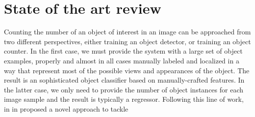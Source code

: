 \newpage
\chapter{State of the art review}
\label{sec:state}

Counting the number of an object of interest in an image can be approached from two different perspectives, either training an object detector, or training an object counter\cite{segui2015learning}. In the first case, we must provide the system with a large set of object examples, properly and almost in all cases manually labeled and localized in a way that represent most of the possible views and appearances of the object. The result is an sophisticated object classifier based on manually-crafted features\cite{viola2004robust, viola2005detecting}. In the latter case, we only need to provide the number of object instances for each image sample and the result is typically a regressor\cite{lempitsky2010learning}. Following this line of work, in  in \cite{segui2015learning} proposed a novel approach to tackle 




